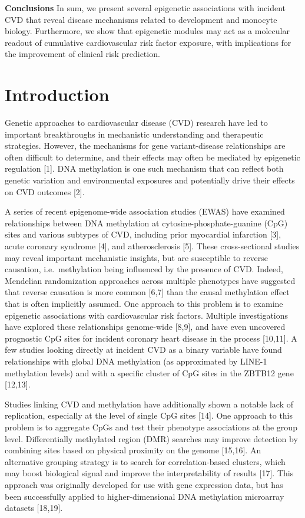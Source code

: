 \documentclass[]{article}
\theoremstyle{definition}
\theoremstyle{definition}
\theoremstyle{definition}
\theoremstyle{remark}
\begin{document}
\textbf{Conclusions} In sum, we present several epigenetic associations
with incident CVD that reveal disease mechanisms related to development
and monocyte biology. Furthermore, we show that epigenetic modules may
act as a molecular readout of cumulative cardiovascular risk factor
exposure, with implications for the improvement of clinical risk
prediction.

\section{Introduction}\label{introduction}

Genetic approaches to cardiovascular disease (CVD) research have led to
important breakthroughs in mechanistic understanding and therapeutic
strategies. However, the mechanisms for gene variant-disease
relationships are often difficult to determine, and their effects may
often be mediated by epigenetic regulation {[}1{]}. DNA methylation is
one such mechanism that can reflect both genetic variation and
environmental exposures and potentially drive their effects on CVD
outcomes {[}2{]}.

A series of recent epigenome-wide association studies (EWAS) have
examined relationships between DNA methylation at
cytosine-phosphate-guanine (CpG) sites and various subtypes of CVD,
including prior myocardial infarction {[}3{]}, acute coronary syndrome
{[}4{]}, and atherosclerosis {[}5{]}. These cross-sectional studies may
reveal important mechanistic insights, but are susceptible to reverse
causation, i.e.~methylation being influenced by the presence of CVD.
Indeed, Mendelian randomization approaches across multiple phenotypes
have suggested that reverse causation is more common {[}6,7{]} than the
causal methylation effect that is often implicitly assumed. One approach
to this problem is to examine epigenetic associations with
cardiovascular risk factors. Multiple investigations have explored these
relationships genome-wide {[}8,9{]}, and have even uncovered prognostic
CpG sites for incident coronary heart disease in the process
{[}10,11{]}. A few studies looking directly at incident CVD as a binary
variable have found relationships with global DNA methylation (as
approximated by LINE-1 methylation levels) and with a specific cluster
of CpG sites in the ZBTB12 gene {[}12,13{]}.

Studies linking CVD and methylation have additionally shown a notable
lack of replication, especially at the level of single CpG sites
{[}14{]}. One approach to this problem is to aggregate CpGs and test
their phenotype associations at the group level. Differentially
methylated region (DMR) searches may improve detection by combining
sites based on physical proximity on the genome {[}15,16{]}. An
alternative grouping strategy is to search for correlation-based
clusters, which may boost biological signal and improve the
interpretability of results {[}17{]}. This approach was originally
developed for use with gene expression data, but has been successfully
applied to higher-dimensional DNA methylation microarray datasets
{[}18,19{]}.
\end{document}
